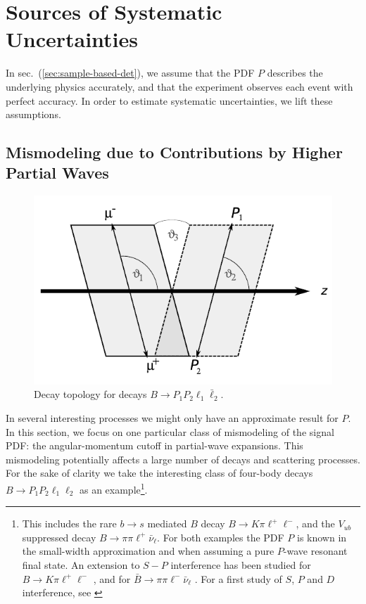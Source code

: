 \documentclass[aps,nofootinbib,preprintnumbers,prd,twocolumn]{revtex4-1}
\newcommand{\refsec}[1]{sec.~(\ref{sec:#1})}
\begin{document}
\section{Sources of Systematic Uncertainties}
\label{sec:systematics}

In \refsec{sample-based-det}, we assume that the PDF $P$ describes the underlying physics accurately,
and that the experiment observes each event with perfect accuracy. In order to estimate systematic
uncertainties, we lift these assumptions.

\subsection{Mismodeling due to Contributions by Higher Partial Waves}
\label{sec:systematics:partial-waves}

\begin{figure}
    \includegraphics[width=.45\textwidth]{fig-topology.pdf}
    \caption{Decay topology for decays $B\to P_1 P_2 \ell_1 \bar\ell_2$. \label{fig:topology}}
\end{figure}

In several interesting processes we might only have an approximate
result for $P$.  In this section, we focus on one particular class of
mismodeling of the signal PDF: the angular-momentum cutoff in partial-wave expansions. This mismodeling potentially affects a large number
of decays and scattering processes. For the sake of clarity we take
the interesting class of four-body decays $B\to P_1 P_2 \ell_1 \ell_2$
as an example\footnote{This includes the rare $b\to s$ mediated $B$ decay $B
  \to K\pi\ell^+\ell^-$, and the $V_{ub}$ suppressed decay $B\to
  \pi\pi\ell^+\bar\nu_\ell$. For both examples the PDF $P$ is known in
  the small-width approximation and when assuming a pure $P$-wave
  resonant final state. An extension to $S-P$ interference has been
  studied for $B\to K\pi\ell^+\ell^-$
  \cite{Blake:2012mb,Becirevic:2011bp}, and for $\bar{B}\to
  \pi\pi\ell^-\bar\nu_\ell$ \cite{Faller:2013dwa}. For a first study
  of $S$, $P$
  and $D$ interference, see \cite{Das:2014sra}
}.\\
\end{document}
